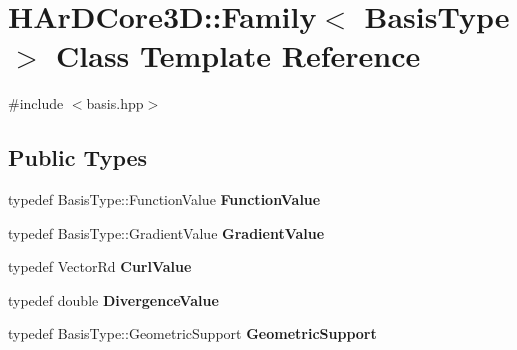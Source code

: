 \hypertarget{classHArDCore3D_1_1Family}{}\section{H\+Ar\+D\+Core3D\+:\+:Family$<$ Basis\+Type $>$ Class Template Reference}
\label{classHArDCore3D_1_1Family}


{\ttfamily \#include $<$basis.\+hpp$>$}

\subsection*{Public Types}
\begin{DoxyCompactItemize}
\item 
\mbox{\label{classHArDCore3D_1_1Family_a2d87c9bf83c4dd0574dc399506d4870c}} 
typedef Basis\+Type\+::\+Function\+Value {\bfseries Function\+Value}
\item 
\mbox{\label{classHArDCore3D_1_1Family_aa4c3dc501f6c7178d2ed5c797f9aefc1}} 
typedef Basis\+Type\+::\+Gradient\+Value {\bfseries Gradient\+Value}
\item 
\mbox{\label{classHArDCore3D_1_1Family_a7b53a354b3fad04c15ba0e35c46d3f51}} 
typedef Vector\+Rd {\bfseries Curl\+Value}
\item 
\mbox{\label{classHArDCore3D_1_1Family_a48cb296e638fde22922d3a583f6cf126}} 
typedef double {\bfseries Divergence\+Value}
\item 
\mbox{\label{classHArDCore3D_1_1Family_a9e16a6663722460eb003835c731bea9c}} 
typedef Basis\+Type\+::\+Geometric\+Support {\bfseries Geometric\+Support}
\end{DoxyCompactItemize}
